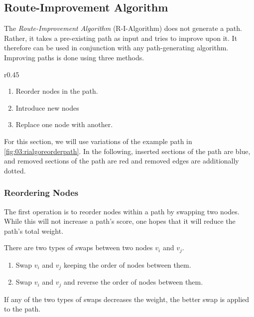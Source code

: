 \subsection{Route-Improvement Algorithm}
\label{subsec:03:rialgo}

The \emph{Route-Improvement Algorithm} (R-I-Algorithm) does not generate a path.
Rather, it takes a pre-existing path as input and tries to improve upon it.
It therefore can be used in conjunction with any path-generating algorithm.
Improving paths is done using three methods.

\begin{wrapfigure}{r}{0.45\textwidth}
	\centering
	\caption{A path generated by some algorithm.}
	\label{fig:03:rialgoreorderpath}
\end{wrapfigure}

\begin{enumerate}
	\itemsep0em
	\item Reorder nodes in the path.
	\item Introduce new nodes
	\item Replace one node with another.
\end{enumerate}

For this section, we will use variations of the example path in \cref{fig:03:rialgoreorderpath}.
In the following, inserted sections of the path are blue, and removed sections of the path are red and removed edges are additionally dotted.

\subsubsection{Reordering Nodes}
\label{subsubsec:03:reorder}

The first operation is to reorder nodes within a path by swapping two nodes.
While this will not increase a path's score, one hopes that it will reduce the path's total weight.

There are two types of swaps between two nodes $v_i$ and $v_j$.
\begin{enumerate}
	\itemsep0em
	\item Swap $v_i$ and $v_j$ keeping the order of nodes between them.
	\item Swap $v_i$ and $v_j$ and reverse the order of nodes between them.
\end{enumerate}
If any of the two types of swaps decreases the weight, the better swap is applied to the path.

